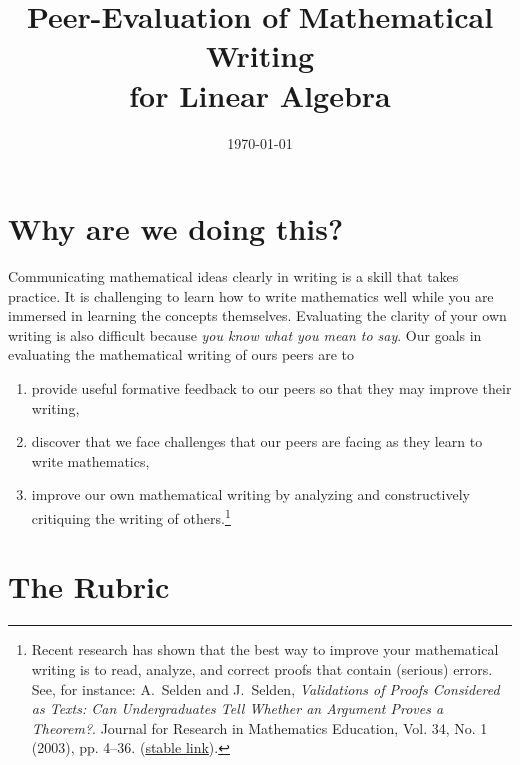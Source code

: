 \documentclass[11pt]{amsart}
\begin{document}
\title[]{Peer-Evaluation of Mathematical Writing\\ for Linear Algebra}
\date{\today}
\maketitle
\section*{Why are we doing this?}
Communicating mathematical ideas clearly in writing is a skill that takes practice.  It is challenging to learn how to write mathematics well while you are immersed in learning the concepts themselves.  Evaluating the clarity of your own writing is also difficult because \textit{you know what you mean to say}.
 Our goals in evaluating the mathematical writing of ours peers are to
\begin{enumerate}
	\item provide useful formative feedback to our peers so that they may improve their writing,
	\item discover that we face challenges that our peers are facing as they learn to write mathematics,
	\item improve our own mathematical writing by analyzing and constructively critiquing the writing of others.\footnote{Recent research has shown that the best way to improve your mathematical writing is to read, analyze, and correct proofs that contain (serious) errors. See, for instance: A.~Selden and J.~Selden, \textit{Validations of Proofs Considered as Texts: Can Undergraduates Tell Whether an Argument Proves a Theorem?}. Journal for Research in Mathematics Education, Vol. 34, No. 1 (2003), pp. 4--36. (\href{http://www.jstor.org/stable/30034698}{stable link}).}
\end{enumerate}

\section*{The Rubric}
\end{document}
